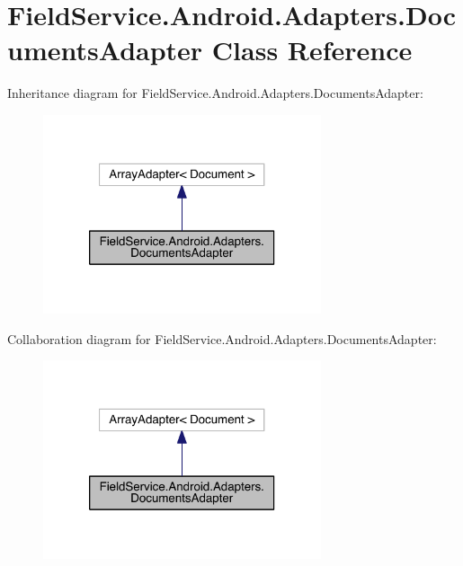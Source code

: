 \hypertarget{class_field_service_1_1_android_1_1_adapters_1_1_documents_adapter}{\section{Field\+Service.\+Android.\+Adapters.\+Documents\+Adapter Class Reference}
\label{class_field_service_1_1_android_1_1_adapters_1_1_documents_adapter}
}


Inheritance diagram for Field\+Service.\+Android.\+Adapters.\+Documents\+Adapter\+:
\nopagebreak
\begin{figure}[H]
\begin{center}
\leavevmode
\includegraphics[width=232pt]{class_field_service_1_1_android_1_1_adapters_1_1_documents_adapter__inherit__graph}
\end{center}
\end{figure}


Collaboration diagram for Field\+Service.\+Android.\+Adapters.\+Documents\+Adapter\+:
\nopagebreak
\begin{figure}[H]
\begin{center}
\leavevmode
\includegraphics[width=232pt]{class_field_service_1_1_android_1_1_adapters_1_1_documents_adapter__coll__graph}
\end{center}
\end{figure}
